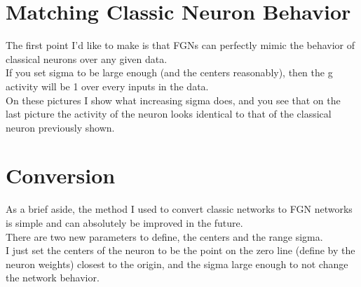 \documentclass{article}
\begin{document}
\section{Matching Classic Neuron Behavior}
The first point I'd like to make is that FGNs can perfectly mimic the behavior of classical neurons over any given data.\\
If you set sigma to be large enough (and the centers reasonably), then the g activity will be 1 over every inputs in the data.\\
On these pictures I show what increasing sigma does, and you see that on the last picture the activity of the neuron looks identical to that of the classical neuron previously shown.

\section{Conversion}
As a brief aside, the method I used to convert classic networks to FGN networks is simple and can absolutely be improved in the future.\\
There are two new parameters to define, the centers and the range sigma.\\
I just set the centers of the neuron to be the point on the zero line (define by the neuron weights) closest to the origin, and the sigma large enough to not change the network behavior.
\end{document}
